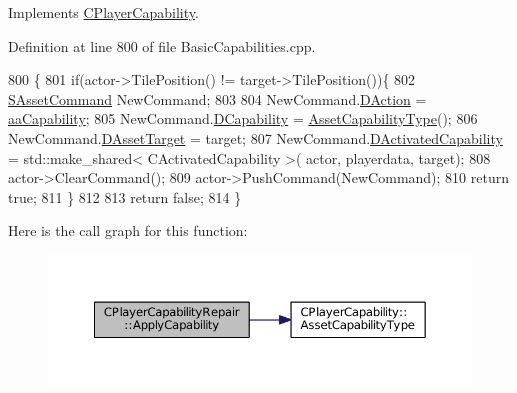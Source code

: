 Implements \hyperlink{classCPlayerCapability_a2ca6fd7fbd9c0178f1cf1d049c63825f}{C\+Player\+Capability}.



Definition at line 800 of file Basic\+Capabilities.\+cpp.


\begin{DoxyCode}
800                                                                                                            
                                                          \{
801     \textcolor{keywordflow}{if}(actor->TilePosition() != target->TilePosition())\{
802         \hyperlink{structSAssetCommand}{SAssetCommand} NewCommand;
803         
804         NewCommand.\hyperlink{structSAssetCommand_a8edd3b3d59a76d5514ba403bc8076a75}{DAction} = \hyperlink{GameDataTypes_8h_ab47668e651a3032cfb9c40ea2d60d670acf9fb164e8abd71c71f4a8c7fda360d4}{aaCapability};
805         NewCommand.\hyperlink{structSAssetCommand_a734ea7c6847457b437360f333f570ff9}{DCapability} = \hyperlink{classCPlayerCapability_a433bb196cd6ab6a932f1cac102b3aa98}{AssetCapabilityType}();
806         NewCommand.\hyperlink{structSAssetCommand_a3d9b43f6e59c386c48c41a65448a0c39}{DAssetTarget} = target;
807         NewCommand.\hyperlink{structSAssetCommand_ad8beda19520811cc70fe1eab16c774dd}{DActivatedCapability} = std::make\_shared< CActivatedCapability >(
      actor, playerdata, target);
808         actor->ClearCommand();
809         actor->PushCommand(NewCommand);
810         \textcolor{keywordflow}{return} \textcolor{keyword}{true};
811     \}
812 
813     \textcolor{keywordflow}{return} \textcolor{keyword}{false};
814 \}
\end{DoxyCode}
Here is the call graph for this function\+:\nopagebreak
\begin{figure}[H]
\begin{center}
\leavevmode
\includegraphics[width=350pt]{classCPlayerCapabilityRepair_ab4e8da6f225b4bfb7023d75749454ff1_cgraph}
\end{center}
\end{figure}
\hypertarget{classCPlayerCapabilityRepair_ae989c67c5e14bbba5b2ddda993ee635a}{}\label{classCPlayerCapabilityRepair_ae989c67c5e14bbba5b2ddda993ee635a} 
